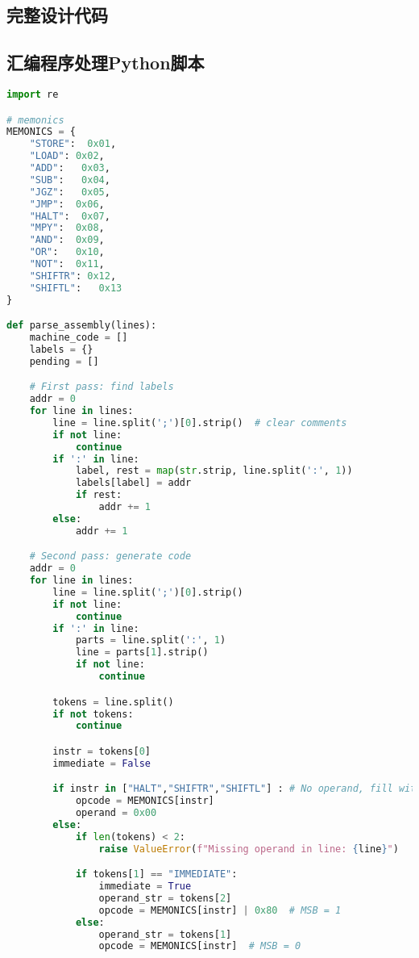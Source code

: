 \documentclass[lang=cn,a4paper,newtx]{elegantpaper}
\begin{document}
\printbibliography
\newpage
\addappheadtotoc
\begin{appendices}
  \section{完整设计代码}
  \subsection{汇编程序处理Python脚本}\label{sec:appendices:python}
  \begin{lstlisting}[language=python,caption={convert.py}]
import re

# memonics
MEMONICS = {
    "STORE":  0x01,
    "LOAD": 0x02,
    "ADD":   0x03,
    "SUB":   0x04,
    "JGZ":   0x05,
    "JMP":  0x06,
    "HALT":  0x07,
    "MPY":  0x08,
    "AND":  0x09,
    "OR":   0x10,
    "NOT":  0x11,
    "SHIFTR": 0x12,
    "SHIFTL":   0x13
}

def parse_assembly(lines):
    machine_code = []
    labels = {}
    pending = []

    # First pass: find labels
    addr = 0
    for line in lines:
        line = line.split(';')[0].strip()  # clear comments
        if not line:
            continue
        if ':' in line:
            label, rest = map(str.strip, line.split(':', 1))
            labels[label] = addr
            if rest:
                addr += 1
        else:
            addr += 1

    # Second pass: generate code
    addr = 0
    for line in lines:
        line = line.split(';')[0].strip()
        if not line:
            continue
        if ':' in line:
            parts = line.split(':', 1)
            line = parts[1].strip()
            if not line:
                continue

        tokens = line.split()
        if not tokens:
            continue

        instr = tokens[0]
        immediate = False

        if instr in ["HALT","SHIFTR","SHIFTL"] : # No operand, fill with 0
            opcode = MEMONICS[instr]
            operand = 0x00
        else:
            if len(tokens) < 2:
                raise ValueError(f"Missing operand in line: {line}")

            if tokens[1] == "IMMEDIATE":
                immediate = True
                operand_str = tokens[2]
                opcode = MEMONICS[instr] | 0x80  # MSB = 1
            else:
                operand_str = tokens[1]
                opcode = MEMONICS[instr]  # MSB = 0


\end{lstlisting}
\end{appendices}
\end{document}
